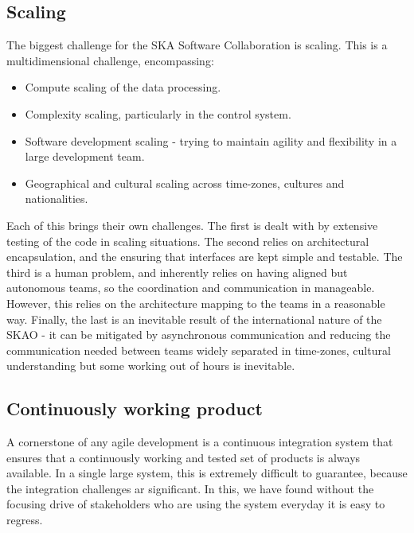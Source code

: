 \documentclass[a4paper,
               biblatex,     %
               keeplastbox,   %
               ]{jacow}
\begin{document}
\subsection{Scaling}
The biggest challenge for the SKA Software Collaboration is scaling. This is a multidimensional challenge, encompassing:
\begin{itemize}
	\item Compute scaling of the data processing.
	\item Complexity scaling, particularly in the control system.
	\item Software development scaling - trying to maintain agility and flexibility in a large development team.
	\item Geographical and cultural scaling across time-zones, cultures and nationalities.
\end{itemize}
Each of this brings their own challenges. The first is dealt with by extensive testing of the code in scaling situations. The second relies on architectural encapsulation, and the ensuring that interfaces are kept simple and testable. The third is a human problem, and inherently relies on having aligned but autonomous teams, so the coordination and communication in manageable. However, this relies on the architecture mapping to the teams in a reasonable way. Finally, the last is an inevitable result of the international nature of the SKAO - it can be mitigated by asynchronous communication and reducing the communication needed between teams widely separated in time-zones, cultural understanding but some working out of hours is inevitable.

\subsection{Continuously working product}
A cornerstone of any agile development is a continuous integration system that ensures that a continuously  working and tested set of products is always available. In a single large system, this is extremely difficult to guarantee, because the integration challenges ar significant. In this, we have found without the focusing drive of stakeholders who are using the system everyday it is easy to regress.
\end{document}
